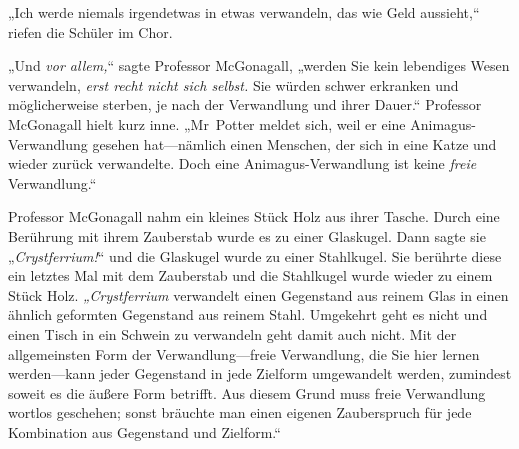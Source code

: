 „Ich werde niemals irgendetwas in etwas verwandeln, das wie Geld aussieht,“ riefen die Schüler im Chor.

„Und \emph{vor allem,}“ sagte Professor McGonagall, „werden Sie kein lebendiges Wesen verwandeln, \emph{erst recht nicht sich selbst.} Sie würden schwer erkranken und möglicherweise sterben, je nach der Verwandlung und ihrer Dauer.“ Professor McGonagall hielt kurz inne. „Mr~Potter meldet sich, weil er eine Animagus-Verwandlung gesehen hat—nämlich einen Menschen, der sich in eine Katze und wieder zurück verwandelte. Doch eine Animagus-Verwandlung ist keine \emph{freie} Verwandlung.“

Professor McGonagall nahm ein kleines Stück Holz aus ihrer Tasche. Durch eine Berührung mit ihrem Zauberstab wurde es zu einer Glaskugel. Dann sagte sie „\emph{Crystferrium!}“ und die Glaskugel wurde zu einer Stahlkugel. Sie berührte diese ein letztes Mal mit dem Zauberstab und die Stahlkugel wurde wieder zu einem Stück Holz. \emph{„Crystferrium} verwandelt einen Gegenstand aus reinem Glas in einen ähnlich geformten Gegenstand aus reinem Stahl. Umgekehrt geht es nicht und einen Tisch in ein Schwein zu verwandeln geht damit auch nicht. Mit der allgemeinsten Form der Verwandlung—freie Verwandlung, die Sie hier lernen werden—kann jeder Gegenstand in jede Zielform umgewandelt werden, zumindest soweit es die äußere Form betrifft. Aus diesem Grund muss freie Verwandlung wortlos geschehen; sonst bräuchte man einen eigenen Zauberspruch für jede Kombination aus Gegenstand und Zielform.“

